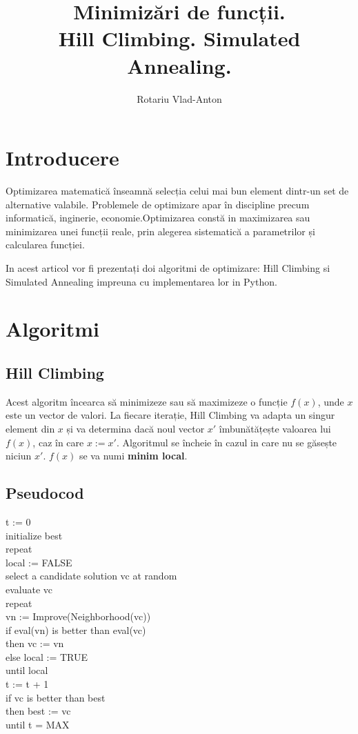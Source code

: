 \documentclass{article}
\author{Rotariu Vlad-Anton}
\title{Minimizări de funcții.\\Hill Climbing. Simulated Annealing.}
\begin{document}
\maketitle

\section{Introducere}
Optimizarea matematică înseamnă selecția celui mai bun element dintr-un set de alternative valabile. Problemele de optimizare apar în discipline precum informatică, inginerie, economie.Optimizarea constă in maximizarea sau minimizarea unei funcții reale, prin alegerea sistematică a parametrilor și calcularea funcției.

In acest articol vor fi prezentați doi algoritmi de optimizare: Hill Climbing si Simulated Annealing impreuna cu implementarea lor in Python.

\section{Algoritmi}
\subsection{Hill Climbing}
Acest algoritm încearca să minimizeze sau să maximizeze o funcție $f(x)$, unde $x$ este un vector de valori. La fiecare iterație, Hill Climbing va adapta un singur element din $x$ și va determina dacă noul vector $x'$ îmbunătățește valoarea lui $f(x)$, caz în care $x := x'$. Algoritmul se încheie în cazul in care nu se găsește niciun $x'$. $f(x)$ se va numi \textbf{minim local}.
\subsection*{Pseudocod}
\begin{tabbing}
t := 0\\
initialize best\\
repeat \=\\
\>  local := FALSE\\
\>  select a candidate solution vc at random\\
\>  evaluate vc\\
\>  repeat \=\\
\>\>    vn := Improve(Neighborhood(vc))\\
\>\> 	if eval(vn) is better than eval(vc)\\
\>\>	then vc := vn\\
\>\>	else local := TRUE\\
\>  until local\\
\>  t := t + 1\\
\>  if vc is better than best\\
\>  then best := vc\\
until t = MAX\\

\end{tabbing}
\end{document}

